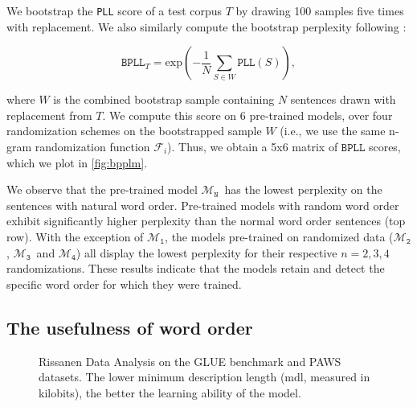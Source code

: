\documentclass[letterpaper, 12pt]{report}
\newcommand{\OR}{$\mathcal{M}_{\texttt{N}}$}
\newcommand{\RI}{$\mathcal{M}_{\texttt{1}}$}
\newcommand{\RII}{$\mathcal{M}_{\texttt{2}}$}
\newcommand{\RIII}{$\mathcal{M}_{\texttt{3}}$}
\newcommand{\RIV}{$\mathcal{M}_{\texttt{4}}$}
\begin{document}
We bootstrap the \texttt{PLL} score of a test corpus $T$ by drawing 100 samples five times with replacement. We also similarly compute the bootstrap perplexity  following \citeauthor{salazar2020a}:

\begin{equation}
    \texttt{BPLL}_{T} = \text{exp}( - \frac{1}{N} \sum_{S \in W} \texttt{PLL}(S)),
\end{equation}

where $W$ is the combined bootstrap sample containing $N$ sentences drawn with replacement from $T$. We compute this score on 6 pre-trained models, over four randomization schemes on the bootstrapped sample $W$ (i.e., we use the same n-gram randomization function $\mathcal{F}_i$). Thus, we obtain a 5x6 matrix of $\texttt{BPLL}$ scores, which we plot in \autoref{fig:bpplm}.

We observe that the pre-trained model \OR\ has the lowest perplexity on the sentences with natural word order. Pre-trained models with random word order exhibit significantly higher perplexity than the normal word order sentences (top row). With the exception of \RI, the models pre-trained on randomized data (\RII, \RIII\ and \RIV) all display the lowest perplexity for their respective $n=2,3,4$ randomizations. %
These results indicate that the models  retain and detect the specific word order for which they were trained.

\subsection{The usefulness of word order}
\label{sec:mlm_rda_analysis}

\begin{figure}[ht]
    \centering
    \caption{Rissanen Data Analysis \citep{perez2021} on the GLUE benchmark and PAWS datasets. The lower minimum description length (\acrshort{mdl}, measured in kilobits), the better the learning ability of the model.}
    \label{fig:mlm_rda}
\end{figure}
\end{document}

